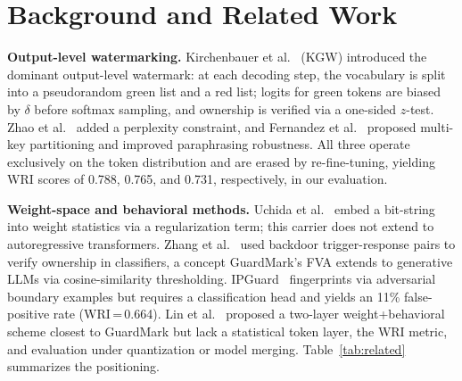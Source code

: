 \documentclass[conference]{IEEEtran}
\begin{document}
\section{Background and Related Work}
\label{sec:background}

\textbf{Output-level watermarking.}
Kirchenbauer et al.~\cite{kirchenbauer2023watermark} (KGW) introduced the
dominant output-level watermark: at each decoding step, the vocabulary is
split into a pseudorandom green list and a red list; logits for green tokens
are biased by $\delta$ before softmax sampling, and ownership is verified via
a one-sided $z$-test.
Zhao et al.~\cite{zhao2023protecting} added a perplexity constraint, and
Fernandez et al.~\cite{fernandez2023three} proposed multi-key partitioning and
improved paraphrasing robustness. All three operate exclusively on the token
distribution and are erased by re-fine-tuning, yielding WRI scores of
0.788, 0.765, and 0.731, respectively, in our evaluation.

\textbf{Weight-space and behavioral methods.}
Uchida et al.~\cite{uchida2017embedding} embed a bit-string into weight
statistics via a regularization term; this carrier does not extend to
autoregressive transformers.
Zhang et al.~\cite{zhang2018protecting} used backdoor trigger-response pairs
to verify ownership in classifiers, a concept GuardMark's FVA extends to
generative LLMs via cosine-similarity thresholding.
IPGuard~\cite{cao2021ipguard} fingerprints via adversarial boundary examples
but requires a classification head and yields an 11\% false-positive rate
(WRI\,=\,0.664).
Lin et al.~\cite{lin2024towards} proposed a two-layer weight+behavioral scheme
closest to GuardMark but lack a statistical token layer, the WRI metric, and
evaluation under quantization or model merging.
Table~\ref{tab:related} summarizes the positioning.
\end{document}

